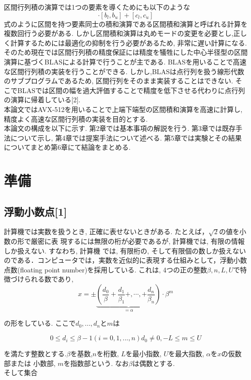 \documentclass[11pt,a4paper]{jsreport}
\theoremstyle{definition}
\begin{document}
区間行列積の演算では1つの要素を導くためにも以下のような
\begin{equation*}
[a_l,a_u] \cdot [b_l,b_u] + [c_l,c_u]
\end{equation*}
式のように区間を持つ要素同士の積和演算である区間積和演算と呼ばれる計算を複数回行う必要がある. しかし区間積和演算は丸めモードの変更を必要とし,正しく計算するためには最適化の抑制を行う必要があるため, 非常に遅い計算になる. そのため現在では区間行列積の精度保証には精度を犠牲にした中心半径型の区間演算に基づくBLASによる計算で行うことが主である. BLASを用いることで高速な区間行列積の実装を行うことができる. しかし,BLASは点行列を扱う線形代数のサブプログラムであるため, 区間行列をそのまま実装することはできない. そこでBLASでは区間の幅を過大評価することで精度を低下させる代わりに点行列の演算に帰着している[2]. \\
\indent 本論文ではAVX-512を用いることで上端下端型の区間積和演算を高速に計算し, 精度よく高速な区間行列積の実装を目的とする. \\
\indent 本論文の構成を以下に示す. 第2章では基本事項の解説を行う. 第3章では既存手法について示し, 第4章では提案手法について述べる. 第5章では実験とその結果についてまとめ第6章にて結論をまとめる.
\newpage
\chapter{準備}
\section{浮動小数点[1]}
  計算機では実数を扱うとき, 正確に表せないときがある. たとえば，$\sqrt{2}$の値を小数の形で厳密に表
現するには無限の桁が必要であるが, 計算機では, 有限の情報しか扱えない. すなわち, 計算機
では, 有限桁の, そして有限個の数しか扱えないのである．コンピュータでは，実数を近似的に表現する仕組みとして，浮動小数点数(floating point 
number)を採用している. これは, 4つの正の整数$β,n,L,U$で特徴づけられる数であり,
  \begin{equation}
    x = \pm\underbrace{\left( \frac{d_0}{\beta}+\frac{d_1}{\beta_1}+, \cdots ,+\frac{d_n}{\beta_n}\right)}_{=\alpha}\cdot\beta^m
  \end{equation}

\noindent の形をしている. ここで$d_0,...,d_n$と$m$は

  \begin{equation}
    0 \leq d_i \leq \beta - 1(i = 0,1,...,n)d_0 \neq 0, -L \leq m \leq U
  \end{equation}

\noindent を満たす整数とする.$\beta$を基数,$n$を桁数, $L$を最小指数, $U$を最大指数, $\alpha$を$x$の仮数部または
小数部, $m$を指数部という. なお$\beta$は偶数とする. \\
 そして集合
\end{document}
